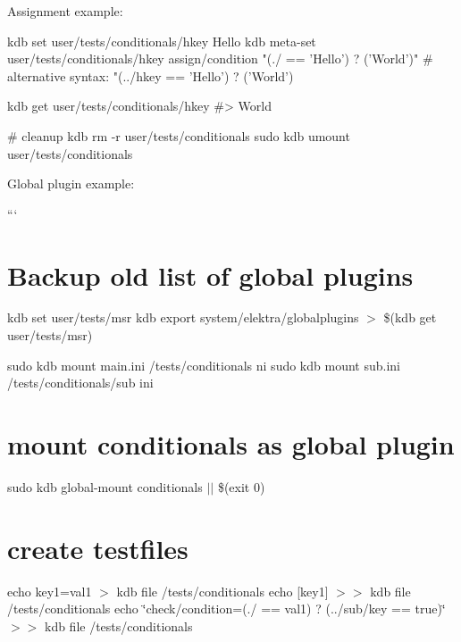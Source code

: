 Assignment example\+:


\begin{DoxyCode}
kdb set user/tests/conditionals/hkey Hello
kdb meta-set user/tests/conditionals/hkey assign/condition "(./ == 'Hello') ? ('World')"
# alternative syntax: "(../hkey == 'Hello') ? ('World')

kdb get user/tests/conditionals/hkey
#> World

# cleanup
kdb rm -r user/tests/conditionals
sudo kdb umount user/tests/conditionals
\end{DoxyCode}


Global plugin example\+:

``` \hypertarget{autotoc_md86_autotoc_md95}{}\section{Backup old list of global plugins}\label{autotoc_md86_autotoc_md95}
kdb set user/tests/msr  kdb export system/elektra/globalplugins $>$ \$(kdb get user/tests/msr)

sudo kdb mount main.\+ini /tests/conditionals ni sudo kdb mount sub.\+ini /tests/conditionals/sub ini\hypertarget{autotoc_md86_autotoc_md96}{}\section{mount conditionals as global plugin}\label{autotoc_md86_autotoc_md96}
sudo kdb global-\/mount conditionals $\vert$$\vert$ \$(exit 0)\hypertarget{autotoc_md86_autotoc_md97}{}\section{create testfiles}\label{autotoc_md86_autotoc_md97}
echo \textquotesingle{}key1=val1\textquotesingle{} $>$ {\ttfamily kdb file /tests/conditionals} echo \textquotesingle{}\mbox{[}key1\mbox{]}\textquotesingle{} $>$$>$ {\ttfamily kdb file /tests/conditionals} echo \char`\"{}check/condition=(./ == \textquotesingle{}val1\textquotesingle{}) ? (../sub/key == \textquotesingle{}true\textquotesingle{})\char`\"{} $>$$>$ {\ttfamily kdb file /tests/conditionals}

